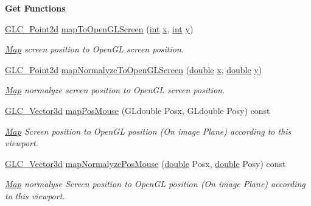 \begin{Indent}{\bf Get Functions}
\begin{DoxyCompactItemize}
\hyperlink{glc__vector2d_8h_aa2ff653e68023d8ac19c421c53fd764a}{G\-L\-C\-\_\-\-Point2d} \hyperlink{class_g_l_c___viewport_a12acabbfb093e3a9bdcfdc3c78dd1c37}{map\-To\-Open\-G\-L\-Screen} (\hyperlink{ioapi_8h_a787fa3cf048117ba7123753c1e74fcd6}{int} \hyperlink{glext_8h_a1db9d104e3c2128177f26aff7b46982f}{x}, \hyperlink{ioapi_8h_a787fa3cf048117ba7123753c1e74fcd6}{int} \hyperlink{glext_8h_a42315f3ed8fff752bb47fd782309fcfc}{y})
\begin{DoxyCompactList}\small\item\em \hyperlink{class_map}{Map} screen position to Open\-G\-L screen position. \end{DoxyCompactList}\item 
\hyperlink{glc__vector2d_8h_aa2ff653e68023d8ac19c421c53fd764a}{G\-L\-C\-\_\-\-Point2d} \hyperlink{class_g_l_c___viewport_ad32d557a535637abde11d7bda3420487}{map\-Normalyze\-To\-Open\-G\-L\-Screen} (\hyperlink{_super_l_u_support_8h_a8956b2b9f49bf918deed98379d159ca7}{double} \hyperlink{glext_8h_a1db9d104e3c2128177f26aff7b46982f}{x}, \hyperlink{_super_l_u_support_8h_a8956b2b9f49bf918deed98379d159ca7}{double} \hyperlink{glext_8h_a42315f3ed8fff752bb47fd782309fcfc}{y})
\begin{DoxyCompactList}\small\item\em \hyperlink{class_map}{Map} normalyze screen position to Open\-G\-L screen position. \end{DoxyCompactList}\item 
\hyperlink{class_g_l_c___vector3d}{G\-L\-C\-\_\-\-Vector3d} \hyperlink{class_g_l_c___viewport_a600f0b5b6dad5f8ef60514e21cac6ed8}{map\-Pos\-Mouse} (G\-Ldouble Posx, G\-Ldouble Posy) const 
\begin{DoxyCompactList}\small\item\em \hyperlink{class_map}{Map} Screen position to Open\-G\-L position (On image Plane) according to this viewport. \end{DoxyCompactList}\item 
\hyperlink{class_g_l_c___vector3d}{G\-L\-C\-\_\-\-Vector3d} \hyperlink{class_g_l_c___viewport_a6f3930b480ae8dbd6b99c6b819d94c0e}{map\-Normalyze\-Pos\-Mouse} (\hyperlink{_super_l_u_support_8h_a8956b2b9f49bf918deed98379d159ca7}{double} Posx, \hyperlink{_super_l_u_support_8h_a8956b2b9f49bf918deed98379d159ca7}{double} Posy) const 
\begin{DoxyCompactList}\small\item\em \hyperlink{class_map}{Map} normalyse Screen position to Open\-G\-L position (On image Plane) according to this viewport. \end{DoxyCompactList}\item 

\end{DoxyCompactItemize}
\end{Indent}
